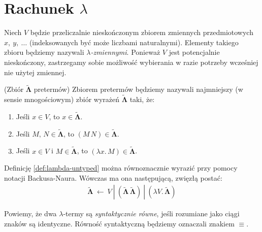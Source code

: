
\section{Rachunek \(\lambda\)}
Niech  \(V\) będzie przeliczalnie nieskończonym zbiorem zmiennych przedmiotowych \(x,\ y,\ \dots\) (indeksowanych być może liczbami naturalnymi). Elementy takiego zbioru będziemy nazywali \emph{\(\lambda\)-zmiennymi}. Ponieważ \(V\) jest potencjalnie nieskończony, zastrzegamy sobie możliwość wybierania w razie potrzeby wcześniej nie użytej zmiennej.

\begin{definicja}(Zbiór \(\mathbf{\tilde\Lambda}\) pretermów)\label{def:lambda-untyped}
Zbiorem pretermów będziemy nazywali najmniejszy (w sensie mnogościowym) zbiór wyrażeń \(\mathbf{\tilde\Lambda}\) taki, że:
  \begin{enumerate}[label={(P\arabic*)}, ref={(P\arabic*)}]
  \setlength\itemsep{0em}
  \item Jeśli \(x \in V\), to \(x\in\mathbf{\tilde\Lambda}\).\label{pret1}
  \item Jeśli \(M,\,N\in \mathbf{\tilde\Lambda}\), to \((M\,N)\in\mathbf{\tilde\Lambda}\).\label{pret2}
  \item Jeśli \(x\in V\) i \(M\in\mathbf{\tilde\Lambda}\), to \((\lambda x.\,M)\in\mathbf{\tilde\Lambda}\).\label{pret3}
  \end{enumerate}
\end{definicja}
Definicję \ref{def:lambda-untyped} można równoznacznie wyrazić przy pomocy notacji Backusa-Naura. Wówczas ma ona następującą, zwięzłą postać:
\begin{align*}
  \mathbf{\tilde\Lambda}\ \leftarrow \ V\ |\ (\mathbf{\tilde\Lambda}\,\mathbf{\tilde\Lambda}) \ |\ (\lambda V.\, \mathbf{\tilde\Lambda})
\end{align*}

Powiemy, że dwa \(\lambda\)-termy są \emph{syntaktycznie równe}, jeśli rozumiane jako ciągi znaków są identyczne. Równość syntaktyczną będziemy oznaczali znakiem \(\equiv\).

